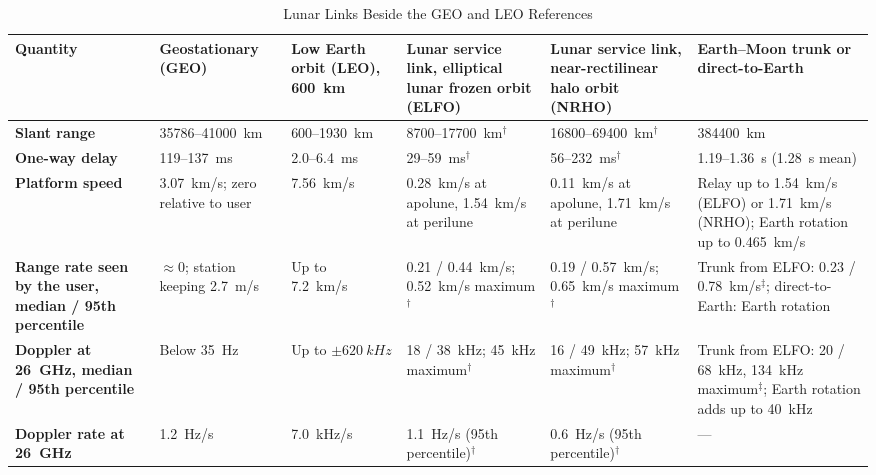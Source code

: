 \documentclass{IEEEoj}
\begin{document}
\begin{table}[!t]
\caption{Lunar Links Beside the GEO and LEO References}
\label{tab:satcom}
\centering
\footnotesize
\begin{tabularx}{\textwidth}{@{}>{\raggedright\arraybackslash\bfseries}p{2.6cm}>{\raggedright\arraybackslash}p{2.3cm}>{\raggedright\arraybackslash}p{2.3cm}>{\raggedright\arraybackslash}p{2.9cm}>{\raggedright\arraybackslash}p{2.9cm}>{\raggedright\arraybackslash}X}
\toprule
\rowcolor{tabhead}\textbf{Quantity} & \textbf{Geostationary (GEO)} & \textbf{Low Earth orbit (LEO), \SI{600}{km}} & \textbf{Lunar service link, elliptical lunar frozen orbit (ELFO)} & \textbf{Lunar service link, near-rectilinear halo orbit (NRHO)} & \textbf{Earth--Moon trunk or direct-to-Earth} \\
\midrule
Slant range & \SI{35786}{}--\SI{41000}{km} & \SI{600}{}--\SI{1930}{km} & \SI{8700}{}--\SI{17700}{km}$^{\dagger}$ & \SI{16800}{}--\SI{69400}{km}$^{\dagger}$ & \SI{384400}{km} \\
One-way delay & \SI{119}{}--\SI{137}{ms} & \SI{2.0}{}--\SI{6.4}{ms} & \SI{29}{}--\SI{59}{ms}$^{\dagger}$ & \SI{56}{}--\SI{232}{ms}$^{\dagger}$ & \SI{1.19}{}--\SI{1.36}{\second} (\SI{1.28}{\second} mean) \\
Platform speed & \SI{3.07}{km/s}; zero relative to user & \SI{7.56}{km/s}~\cite{3gpp_tr_38811} & \SI{0.28}{km/s} at apolune, \SI{1.54}{km/s} at perilune & \SI{0.11}{km/s} at apolune, \SI{1.71}{km/s} at perilune & Relay up to \SI{1.54}{km/s} (ELFO) or \SI{1.71}{km/s} (NRHO); Earth rotation up to \SI{0.465}{km/s} \\
Range rate seen by the user, median / 95th percentile & ${\approx}0$; station keeping \SI{2.7}{m/s}~\cite{3gpp_tr_38811} & Up to \SI{7.2}{km/s}~\cite{3gpp_tr_38821} & \SI{0.21}{} / \SI{0.44}{km/s}; \SI{0.52}{km/s} maximum$^{\dagger}$ & \SI{0.19}{} / \SI{0.57}{km/s}; \SI{0.65}{km/s} maximum$^{\dagger}$ & Trunk from ELFO: \SI{0.23}{} / \SI{0.78}{km/s}$^{\ddagger}$; direct-to-Earth: Earth rotation \\
Doppler at \SI{26}{GHz}, median / 95th percentile & Below \SI{35}{Hz}~\cite{3gpp_tr_38811} & Up to $\pm\SI{620}{kHz}$~\cite{3gpp_tr_38821} & \SI{18}{} / \SI{38}{kHz}; \SI{45}{kHz} maximum$^{\dagger}$ & \SI{16}{} / \SI{49}{kHz}; \SI{57}{kHz} maximum$^{\dagger}$ & Trunk from ELFO: \SI{20}{} / \SI{68}{kHz}, \SI{134}{kHz} maximum$^{\ddagger}$; Earth rotation adds up to \SI{40}{kHz} \\
Doppler rate at \SI{26}{GHz} & \SI{1.2}{Hz/s}~\cite{3gpp_tr_38821} & \SI{7.0}{kHz/s}~\cite{3gpp_tr_38821} & \SI{1.1}{Hz/s} (95th percentile)$^{\dagger}$ & \SI{0.6}{Hz/s} (95th percentile)$^{\dagger}$ & --- \\

\end{tabularx}
\end{table}
\end{document}
